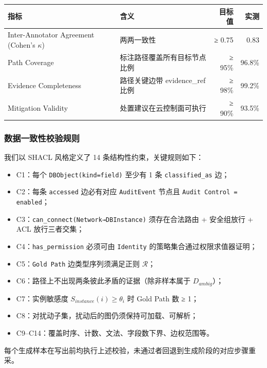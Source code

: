 \documentclass[a4paper,12pt]{ctexart}
\begin{document}
\begin{table}[htbp]
\centering
\small
\setlength{\tabcolsep}{4pt}
\begin{tabular}{|l|l|r|r|}
\hline
\textbf{指标} & \textbf{含义} & \textbf{目标值} & \textbf{实测} \\
\hline
Inter-Annotator Agreement (Cohen's $\kappa$) & 两两一致性 & ≥ 0.75 & 0.83 \\
\hline
Path Coverage & 标注路径覆盖所有目标节点比例 & ≥ 95\% & 96.8\% \\
\hline
Evidence Completeness & 路径关键边带 evidence\_ref 比例 & ≥ 98\% & 99.2\% \\
\hline
Mitigation Validity & 处置建议在云控制面可执行 & ≥ 90\% & 93.5\% \\
\hline
\end{tabular}
\end{table}

\subsubsection{数据一致性校验规则}

我们以 SHACL 风格定义了 14 条结构性约束，关键规则如下：

\begin{itemize}[leftmargin=*]
\item C1：每个 \texttt{DBObject(kind=field)} 至少有 1 条 \texttt{classified\_as} 边；
\item C2：每条 \texttt{accessed} 边必有对应 \texttt{AuditEvent} 节点且 \texttt{Audit Control = enabled}；
\item C3：\texttt{can\_connect(Network→DBInstance)} 须存在合法路由 + 安全组放行 + ACL 放行三者交集；
\item C4：\texttt{has\_permission} 必须可由 \texttt{Identity} 的策略集合通过权限求值器证明；
\item C5：\texttt{Gold Path} 边类型序列须满足正则 $\mathcal{R}$；
\item C6：路径上不出现两条彼此矛盾的证据（除非样本属于 $D_{ambig}$）；
\item C7：实例敏感度 $S_{instance}(i) \ge \theta_i$ 时 Gold Path 数 ≥ 1；
\item C8：对扰动子集，扰动后的图仍须保持可加载、可解析；
\item C9–C14：覆盖时序、计数、文法、字段数下界、边权范围等。
\end{itemize}

每个生成样本在写出前均执行上述校验，未通过者回退到生成阶段的对应步骤重采。
\end{document}
